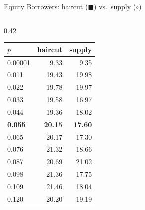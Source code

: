 \documentclass[aspectratio=169,10pt]{beamer}
\begin{document}
\begin{frame}{Equity Borrowers: haircut ($\blacksquare$) vs.\ supply ($\circ$)}
\begin{columns}[T]
\begin{column}{0.42\textwidth}
\begin{tabular}{lrr}
        $p$ & haircut & supply \\
        \midrule
        0.00001 & 9.33 & 9.35 \\
        0.011 & 19.43 & 19.98 \\
        0.022 & 19.78 & 19.97 \\
        0.033 & 19.58 & 16.97 \\
        0.044 & 19.36 & 18.02 \\
        \textbf{0.055} & \textbf{20.15} & \textbf{17.60} \\
        0.065 & 20.17 & 17.30 \\
        0.076 & 21.32 & 18.66 \\
        0.087 & 20.69 & 21.02 \\
        0.098 & 21.36 & 17.75 \\
        0.109 & 21.46 & 18.04 \\
        0.120 & 20.20 & 19.19 \\
        \bottomrule
      \end{tabular}
    \end{column}
  \end{columns}
\end{frame}
\end{document}
